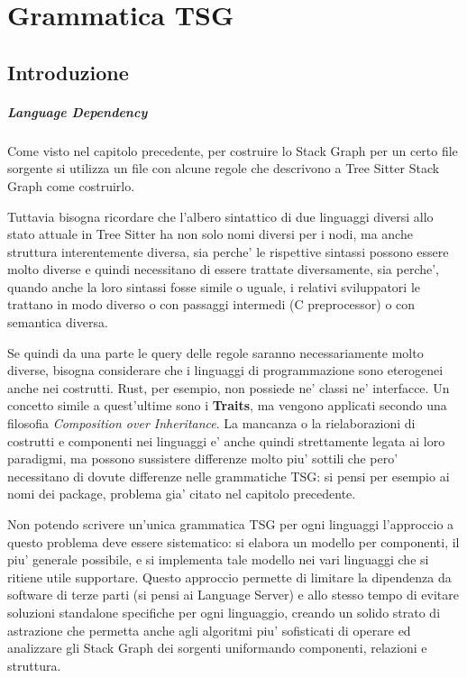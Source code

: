 \chapter{Grammatica TSG}

\section{Introduzione}

\paragraph{Language Dependency}

Come visto nel capitolo precedente, per costruire lo Stack Graph per un certo file sorgente si utilizza un file con alcune regole che descrivono a Tree Sitter Stack Graph come costruirlo.

Tuttavia bisogna ricordare che l'albero sintattico di due linguaggi diversi allo stato attuale in Tree Sitter ha non solo nomi diversi per i nodi, ma anche struttura interentemente diversa, sia perche' le rispettive sintassi possono essere molto diverse e quindi necessitano di essere trattate diversamente, sia perche', quando anche la loro sintassi fosse simile o uguale, i relativi sviluppatori le trattano in modo diverso o con passaggi intermedi (C preprocessor) o con semantica diversa.

Se quindi da una parte le query delle regole saranno necessariamente molto diverse, bisogna considerare che i linguaggi di programmazione sono eterogenei anche nei costrutti.
Rust, per esempio, non possiede ne' classi ne' interfacce. Un concetto simile a quest'ultime sono i \textbf{Traits}, ma vengono applicati secondo una filosofia \emph{Composition over Inheritance}.
La mancanza o la rielaborazioni di costrutti e componenti nei linguaggi e' anche quindi strettamente legata ai loro paradigmi, ma possono sussistere differenze molto piu' sottili che pero' necessitano di dovute differenze nelle grammatiche TSG: si pensi per esempio ai nomi dei package, problema gia' citato nel capitolo precedente.

Non potendo scrivere un'unica grammatica TSG per ogni linguaggi l'approccio a questo problema deve essere sistematico: si elabora un modello per componenti, il piu' generale possibile, e si implementa tale modello nei vari linguaggi che si ritiene utile supportare.
Questo approccio permette di limitare la dipendenza da software di terze parti (si pensi ai Language Server) e allo stesso tempo di evitare soluzioni standalone specifiche per ogni linguaggio, creando un solido strato di astrazione che permetta anche agli algoritmi piu' sofisticati di operare ed analizzare gli Stack Graph dei sorgenti uniformando componenti, relazioni e struttura.


